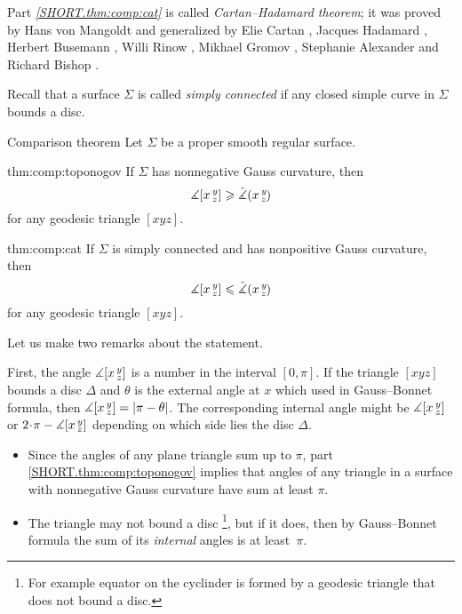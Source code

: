 Part \textit{\ref{SHORT.thm:comp:cat}} is called \emph{Cartan--Hadamard theorem};
it was proved by 
Hans von Mangoldt \cite{mangoldt} and generalized by Elie Cartan \cite{cartan}, Jacques Hadamard \cite{hadamard},
Herbert Busemann \cite{busemann},
Willi Rinow \cite{rinow},
Mikhael Gromov \cite[p.~119]{gromov},
Stephanie Alexander and Richard Bishop \cite{alexander-bishop1990}.

Recall that a surface $\Sigma$ is called {}\emph{simply connected} if any closed simple curve in $\Sigma$ bounds a disc.

\begin{thm}{Comparison theorem}\label{thm:comp}
Let $\Sigma$ be a proper smooth regular surface.

\begin{subthm}{thm:comp:toponogov}
If $\Sigma$ has nonnegative Gauss curvature, then 
 \[\measuredangle[x\,{}^{y}_{z}]\geqslant\tilde\measuredangle(x\,{}^{y}_{z}\hspace{-0.2ex})\]
for any geodesic triangle $[xyz]$.
\end{subthm}

\begin{subthm}{thm:comp:cat}
If $\Sigma$ is simply connected and has nonpositive Gauss curvature,
 then 
\[\measuredangle[x\,{}^{y}_{z}]\leqslant\tilde\measuredangle(x\,{}^{y}_{z}\hspace{-0.2ex})\]
for any geodesic triangle $[xyz]$.
\end{subthm}

\end{thm}


Let us make two remarks about the statement.

First, the angle $\measuredangle[x\,{}^{y}_{z}]$ is a number in the interval $[0,\pi]$.
If the triangle $[xyz]$ bounds a disc $\Delta$ and $\theta$ is the external angle at  $x$ which used in Gauss--Bonnet formula, 
then $\measuredangle[x\,{}^{y}_{z}]=|\pi-\theta|$.
The corresponding internal angle might be $\measuredangle[x\,{}^{y}_{z}]$ or $2\cdot\pi-\measuredangle\hinge {x}{y}{z}$ depending on which side lies the disc $\Delta$.

\begin{itemize}
\item Since the angles of any plane triangle sum up to $\pi$,
part \ref{SHORT.thm:comp:toponogov} implies that angles of any triangle in a surface with nonnegative Gauss curvature have sum at least $\pi$.

\item The triangle may not bound a disc%
\footnote{For example equator on the cyclinder is formed by a geodesic triangle that does not bound a disc.}, but  if it does, then by Gauss--Bonnet formula the sum of its {}\emph{internal} angles is at least~$\pi$.
\end{itemize}

